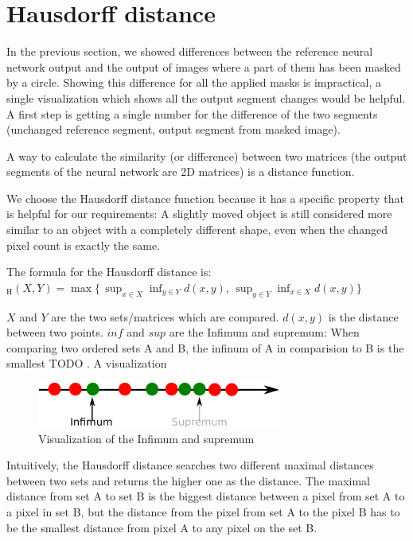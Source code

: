 \section{Hausdorff distance}
\label{hausdorff_distance_chapter}

In the previous section, we showed differences between the reference neural network output and the output of images where a part of them has been masked by a circle.
Showing this difference for all the applied masks is impractical, a single visualization which shows all the output segment changes would be helpful.
A first step is getting a single number for the difference of the two segments (unchanged reference segment, output segment from masked image).

A way to calculate the similarity (or difference) between two matrices (the output segments of the neural network are 2D matrices) is a distance function.

We choose the Hausdorff distance function because it has a specific property that is helpful for our requirements: A slightly moved object is still considered more similar to
an object with a completely different shape, even when the changed pixel count is exactly the same.

The formula for the Hausdorff distance is:
$ _{\mathrm {H} }(X,Y)=\max\{\,\sup _{x\in X}\inf _{y\in Y}d(x,y),\,\sup _{y\in Y}\inf _{x\in X}d(x,y)\} $

$X$ and $Y$ are the two sets/matrices which are compared. $d(x,y)$ is the distance between two points. $inf$ and $sup$ are the Infimum and supremum: When comparing two
ordered sets A and B, the infinum of A in comparision to B is the smallest TODO . A visualization

\begin{figure}[H]
\centering
\includegraphics[width=8cm]{chapters/06_hdm/images/inf_sup.png}
\caption{Visualization of the Infimum and supremum \cite{hausdorffdistanceimage2}}
\label{inf_sup}
\end{figure}

Intuitively, the Hausdorff distance searches two different maximal distances between two sets and returns the higher one as the distance.
The maximal distance from set A to set B is the biggest distance between a pixel from set A to a pixel in set B, but the distance from the pixel from set A to the pixel B has to be the smallest distance from pixel A to any pixel on the set B.

